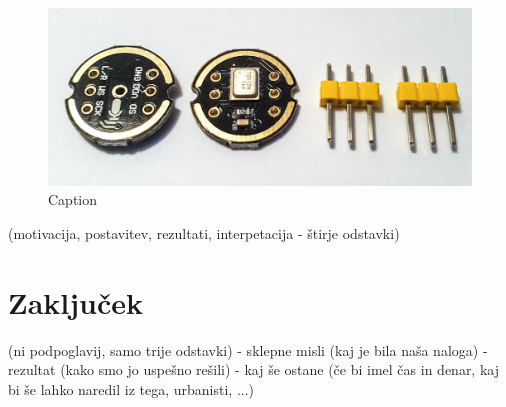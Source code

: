 \documentclass[a4paper, 12pt]{book}
\begin{document}
\begin{figure}[H]
    \centering
    \includegraphics[width=\linewidth]{slikovno_gradivo/INMP441_1.jpg}
    \caption{Caption}
    \label{fig:INMP441}
\end{figure}

(motivacija, postavitev, rezultati, interpetacija - štirje odstavki)

\chapter{Zaključek}
(ni podpoglavij, samo trije odstavki)
- sklepne misli (kaj je bila naša naloga)
- rezultat (kako smo jo uspešno rešili)
- kaj še ostane (če bi imel čas in denar, kaj bi še lahko naredil iz tega, urbanisti, ...)



\newpage %
\ \\
\clearpage
{}


\end{document}
